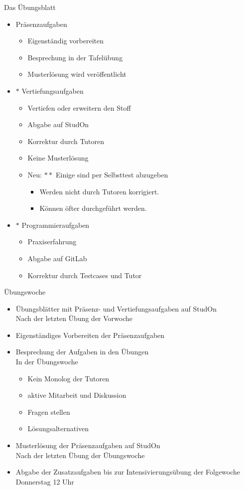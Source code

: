 \begin{frame}{Das Übungsblatt}
\Large
\begin{itemize}
\item Präsenzaufgaben
\begin{itemize}
\item Eigenständig vorbereiten
\item Besprechung in der Tafelübung
\item Musterlösung wird veröffentlicht
\end{itemize}
\item $\ast$ Vertiefungsaufgaben
\begin{itemize}
\item Vertiefen oder erweitern den Stoff
\item Abgabe auf StudOn
\item Korrektur durch Tutoren
\item Keine Musterlösung
\item \alert{Neu:} $\ast\ast$ Einige sind per Selbsttest abzugeben
\begin{itemize}
	\item Werden nicht durch Tutoren korrigiert.
	\item Können öfter durchgeführt werden.
\end{itemize}
\end{itemize}
\item $\ast$ Programmieraufgaben
\begin{itemize}
\item Praxiserfahrung
\item Abgabe auf GitLab
\item Korrektur durch Testcases und Tutor
\end{itemize}
\end{itemize}
\end{frame}


\begin{frame}{Übungswoche}
\large
\begin{itemize}
\item Übungsblätter mit Präsenz- und Vertiefungsaufgaben auf StudOn\\
{\small Nach der letzten Übung der Vorwoche}
\item Eigenständiges Vorbereiten der Präsenzaufgaben
\item Besprechung der Aufgaben in den Übungen\\
{\small In der Übungswoche}
\begin{itemize}
\item Kein Monolog der Tutoren
\item aktive Mitarbeit und Diskussion
\item Fragen stellen
\item Lösungsalternativen
\end{itemize}
\item Musterlösung der Präsenzaufgaben auf StudOn\\
{\small Nach der letzten Übung der Übungswoche}
\item Abgabe der Zusatzaufgaben bis zur Intensivierungsübung der Folgewoche\\
\alert{Donnerstag 12 Uhr}
\end{itemize}
\end{frame}


